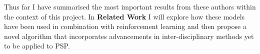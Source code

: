Thus far I have summarised the most important results from these authors within the context of this project.
In \textbf{Related Work} I will explore how these models have been used in combination with
reinforcement learning and then propose a novel algorithm that incorporates 
advancements in inter-disciplinary methods yet to be applied to PSP.